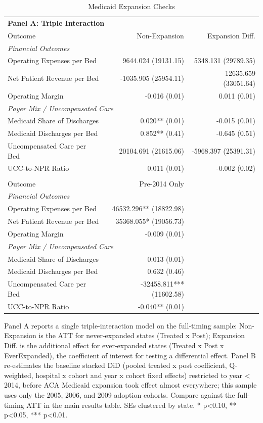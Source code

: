 \begin{table}[!h]
\centering
\caption{Medicaid Expansion Checks}
\begin{tabular}{lrr}
\toprule
\multicolumn{3}{l}{\textbf{Panel A: Triple Interaction}}\\
Outcome & Non-Expansion & Expansion Diff. \\
\midrule
\multicolumn{3}{l}{\textit{Financial Outcomes}}\\
Operating Expenses per Bed & 9644.024 (19131.15) & 5348.131 (29789.35) \\
Net Patient Revenue per Bed & -1035.905 (25954.11) & 12635.659 (33051.64) \\
Operating Margin & -0.016 (0.01) & 0.011 (0.01) \\
\multicolumn{3}{l}{\textit{Payer Mix / Uncompensated Care}}\\
Medicaid Share of Discharges & 0.020** (0.01) & -0.015 (0.01) \\
Medicaid Discharges per Bed & 0.852** (0.41) & -0.645 (0.51) \\
Uncompensated Care per Bed & 20104.691 (21615.06) & -5968.397 (25391.31) \\
UCC-to-NPR Ratio & 0.011 (0.01) & -0.002 (0.02) \\
\addlinespace
\multicolumn{3}{l}{\textbf{Panel B: Pre-2014-Only ("No Expansion")}}\\
Outcome & Pre-2014 Only &  \\
\midrule
\multicolumn{3}{l}{\textit{Financial Outcomes}}\\
Operating Expenses per Bed & 46532.296** (18822.98) &  \\
Net Patient Revenue per Bed & 35368.055* (19056.73) &  \\
Operating Margin & -0.009 (0.01) &  \\
\multicolumn{3}{l}{\textit{Payer Mix / Uncompensated Care}}\\
Medicaid Share of Discharges & 0.013 (0.01) &  \\
Medicaid Discharges per Bed & 0.632 (0.46) &  \\
Uncompensated Care per Bed & -32458.811*** (11602.58) &  \\
UCC-to-NPR Ratio & -0.040** (0.01) &  \\
\bottomrule
\end{tabular}
\footnotesize{Panel A reports a single triple-interaction model on the full-timing sample: Non-Expansion is the ATT for never-expanded states (Treated x Post); Expansion Diff. is the additional effect for ever-expanded states (Treated x Post x EverExpanded), the coefficient of interest for testing a differential effect. Panel B re-estimates the baseline stacked DiD (pooled treated x post coefficient, Q-weighted, hospital x cohort and year x cohort fixed effects) restricted to year < 2014, before ACA Medicaid expansion took effect almost everywhere; this sample uses only the 2005, 2006, and 2009 adoption cohorts. Compare against the full-timing ATT in the main results table. SEs clustered by state. * p<0.10, ** p<0.05, *** p<0.01.}
\end{table}
